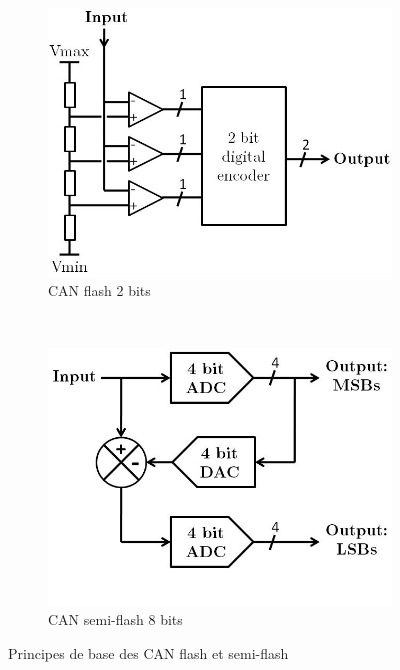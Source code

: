 \documentclass{article}
\begin{document}
\begin{figure}[h]
  \centering
  \begin{subfigure}[b]{0.4\textwidth}
    \centering
    \includegraphics[width=\textwidth]{2bitFlash}
    \caption{CAN flash 2 bits}
    \label{fig:flash}
  \end{subfigure}
  ~~~~~~~~
  \begin{subfigure}[b]{0.4\textwidth}
    \centering
    \includegraphics[width=\textwidth]{8bitSemiFlash}
    \caption{CAN semi-flash 8 bits}
    \label{fig:semiflash}
  \end{subfigure}
  \caption{Principes de base des CAN flash et semi-flash}
\end{figure}
\end{document}
